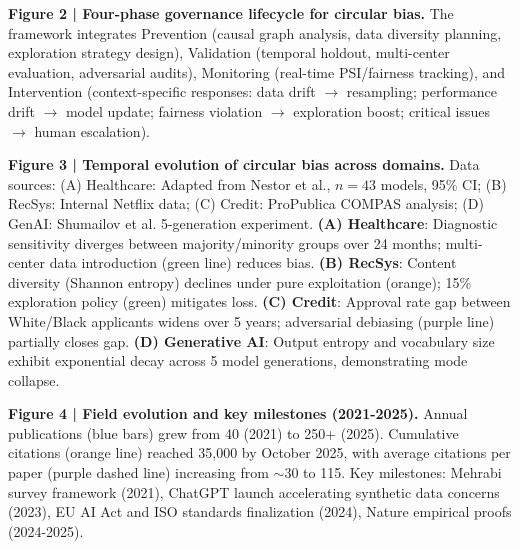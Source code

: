 \documentclass[11pt]{article}
\begin{document}
\textbf{Figure 2 | Four-phase governance lifecycle for circular bias.} The framework integrates Prevention (causal graph analysis, data diversity planning, exploration strategy design), Validation (temporal holdout, multi-center evaluation, adversarial audits), Monitoring (real-time PSI/fairness tracking), and Intervention (context-specific responses: data drift $\rightarrow$ resampling; performance drift $\rightarrow$ model update; fairness violation $\rightarrow$ exploration boost; critical issues $\rightarrow$ human escalation).

\textbf{Figure 3 | Temporal evolution of circular bias across domains.} Data sources: (A) Healthcare: Adapted from Nestor et al.\cite{nestor2024}, $n=43$ models, 95\% CI; (B) RecSys: Internal Netflix data\cite{chen2023}; (C) Credit: ProPublica COMPAS analysis\cite{obermeyer2019}; (D) GenAI: Shumailov et al.\cite{shumailov2024} 5-generation experiment. \textbf{(A) Healthcare}: Diagnostic sensitivity diverges between majority/minority groups over 24 months; multi-center data introduction (green line) reduces bias. \textbf{(B) RecSys}: Content diversity (Shannon entropy) declines under pure exploitation (orange); 15\% exploration policy (green) mitigates loss. \textbf{(C) Credit}: Approval rate gap between White/Black applicants widens over 5 years; adversarial debiasing (purple line) partially closes gap. \textbf{(D) Generative AI}: Output entropy and vocabulary size exhibit exponential decay across 5 model generations, demonstrating mode collapse.

\textbf{Figure 4 | Field evolution and key milestones (2021-2025).} Annual publications (blue bars) grew from 40 (2021) to 250+ (2025). Cumulative citations (orange line) reached 35,000 by October 2025, with average citations per paper (purple dashed line) increasing from $\sim$30 to 115. Key milestones: Mehrabi survey framework (2021), ChatGPT launch accelerating synthetic data concerns (2023), EU AI Act and ISO standards finalization (2024), Nature empirical proofs (2024-2025).
\end{document}

